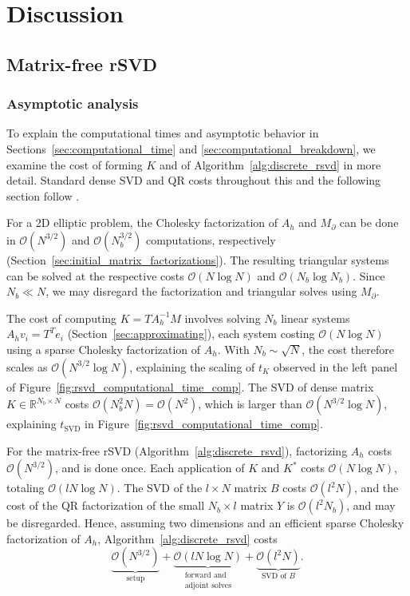 \section{Discussion}\label{sec:discussion}
\subsection{Matrix-free rSVD}
\subsubsection{Asymptotic analysis}
To explain the computational times and asymptotic behavior in Sections~\ref{sec:computational_time} and \ref{sec:computational_breakdown}, we examine the cost of forming $K$ and of Algorithm~\ref{alg:discrete_rsvd} in more detail. Standard dense SVD and QR costs throughout this and the following section follow \cite{golubMatrixComputations4th2013}.

For a 2D elliptic problem, the Cholesky factorization of $A_h$ and $M_\partial$ can be done in $\mathcal{O}(N^{3/2})$ and $\mathcal{O}(N_b^{3/2})$ computations, respectively (Section~\ref{sec:initial_matrix_factorizations}). The resulting triangular systems can be solved at the respective costs $\mathcal{O}(N \log N)$ and $\mathcal{O}(N_b \log N_b)$. Since $N_b \ll N$, we may disregard the factorization and triangular solves using $M_\partial$. 

The cost of computing $K = T A_h^{-1} M$ involves solving $N_b$ linear systems $A_h v_i = T^T e_i$ (Section~\ref{sec:approximating}), each system costing $\mathcal{O}(N \log N)$ using a sparse Cholesky factorization of $A_h$. With $N_b \sim \sqrt{N}$, the cost therefore scales as $\mathcal{O}(N^{3/2} \log N)$, explaining the scaling of $t_K$ observed in the left panel of Figure~\ref{fig:rsvd_computational_time_comp}. The SVD of dense matrix $K \in \mathbb{R}^{N_b \times N}$ costs $\mathcal{O}(N_b^2 N) = \mathcal{O}(N^2)$, which is larger than $\mathcal{O}(N^{3/2} \log N)$, explaining $t_{\text{SVD}}$ in Figure~\ref{fig:rsvd_computational_time_comp}.

For the matrix-free rSVD (Algorithm~\ref{alg:discrete_rsvd}), factorizing $A_h$ costs $\mathcal{O}(N^{3/2})$, and is done once. Each application of $K$ and $K^*$ costs $\mathcal{O}(N \log N)$, totaling $\mathcal{O}(l N \log N)$. The SVD of the $l \times N$ matrix $B$ costs $\mathcal{O}(l^2 N)$, and the cost of the QR factorization of the small $N_b \times l$ matrix $Y$ is $\mathcal{O}(l^2 N_b)$, and may be disregarded. Hence, assuming two dimensions and an efficient sparse Cholesky factorization of $A_h$, Algorithm~\ref{alg:discrete_rsvd} costs
\begin{equation}\label{eq:rsvd_cost}
    \underbrace{\mathcal{O}(N^{3/2})}_{\text{setup}}
    + \underbrace{\mathcal{O}(l N \log N)}_{\substack{\text{forward and} \\ \text{adjoint solves}}}
    + \underbrace{\mathcal{O}(l^2 N)}_{\text{SVD of } B}.
\end{equation}

